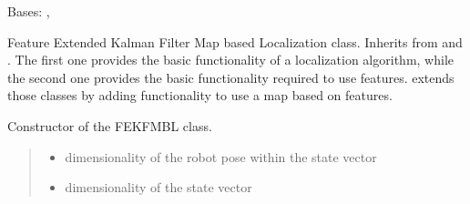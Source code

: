 \documentclass[letterpaper,10pt,english]{sphinxmanual}
\begin{document}
\begin{fulllineitems}
\label{\detokenize{FEKFMBLocalization:FEKFMBL.FEKFMBL}}
\pysigstartsignatures
{}
\pysigstopsignatures
\sphinxAtStartPar
Bases: {\hyperref[\detokenize{GFLocalization:GFLocalization.GFLocalization}]{}}, {\hyperref[\detokenize{FEKFMBLocalization:MapFeature.MapFeature}]{}}

\sphinxAtStartPar
Feature Extended Kalman Filter Map based Localization class. Inherits from {\hyperref[\detokenize{GFLocalization:GFLocalization.GFLocalization}]{}} and {\hyperref[\detokenize{FEKFMBLocalization:MapFeature.MapFeature}]{}}.
The first one provides the basic functionality of a localization algorithm, while the second one provides the basic functionality required to use features.
{\hyperref[\detokenize{FEKFMBLocalization:FEKFMBL.FEKFMBL}]{}} extends those classes by adding functionality to use a map based on features.

\begin{fulllineitems}
\label{\detokenize{FEKFMBLocalization:FEKFMBL.FEKFMBL.__init__}}
\pysigstartsignatures
{}
\pysigstopsignatures
\sphinxAtStartPar
Constructor of the FEKFMBL class.
\begin{quote}\begin{description}
\begin{itemize}
\item {} 
\sphinxAtStartPar
{} \textendash{} dimensionality of the robot pose within the state vector

\item {} 
\sphinxAtStartPar
{} \textendash{} dimensionality of the state vector


\end{itemize}
\end{description}
\end{quote}
\end{fulllineitems}
\end{fulllineitems}
\end{document}
